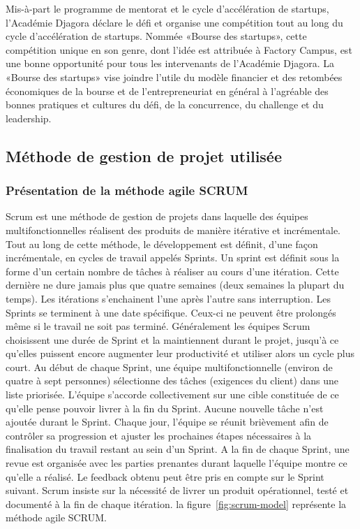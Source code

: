 
Mis-à-part le programme de mentorat et le cycle d’accélération de startups,
l'Académie Djagora déclare le défi et organise une compétition tout au long
du cycle d’accélération de startups. Nommée «Bourse des startups», cette
compétition unique en son genre, dont l'idée est attribuée à Factory Campus,
est une bonne opportunité pour tous les intervenants de l'Académie Djagora.
La «Bourse des startups» vise joindre l'utile du modèle financier et des retombées
économiques de la bourse et de l'entrepreneuriat en général à l'agréable des
bonnes pratiques et cultures du défi, de la concurrence, du challenge et du
leadership.
\subsection{Méthode de gestion de projet utilisée}
\subsubsection{Présentation de la méthode agile SCRUM}
Scrum est une méthode de gestion de projets dans laquelle des équipes
multifonctionnelles réalisent des produits de manière itérative et incrémentale. Tout au
long de cette méthode, le développement est définit, d’une façon incrémentale, en cycles
de travail appelés Sprints. Un sprint est définit sous la forme d’un certain nombre de
tâches à réaliser au cours d’une itération. Cette dernière ne dure jamais plus que quatre
semaines (deux semaines la plupart du temps). Les itérations s’enchainent l’une après
l’autre sans interruption. Les Sprints se terminent à une date spécifique. Ceux-ci ne
peuvent être prolongés même si le travail ne soit pas terminé. Généralement les équipes
Scrum choisissent une durée de Sprint et la maintiennent durant le projet, jusqu’à ce
qu’elles puissent encore augmenter leur productivité et utiliser alors un cycle plus court.
Au début de chaque Sprint, une équipe multifonctionnelle (environ de quatre à sept
personnes) sélectionne des tâches (exigences du client) dans une liste priorisée.
L’équipe s’accorde collectivement sur une cible constituée de ce qu’elle pense pouvoir
livrer à la fin du Sprint. Aucune nouvelle tâche n’est ajoutée durant le Sprint. Chaque
jour, l’équipe se réunit brièvement afin de contrôler sa progression et ajuster les
prochaines étapes nécessaires à la finalisation du travail restant au sein d’un Sprint. A la
fin de chaque Sprint, une revue est organisée avec les parties prenantes durant laquelle
l’équipe montre ce qu’elle a réalisé. Le feedback obtenu peut être pris en compte sur le
Sprint suivant. Scrum insiste sur la nécessité de livrer un produit opérationnel,
testé et documenté à la fin de chaque itération.
la figure~\ref{fig:scrum-model} représente la méthode agile SCRUM. 

